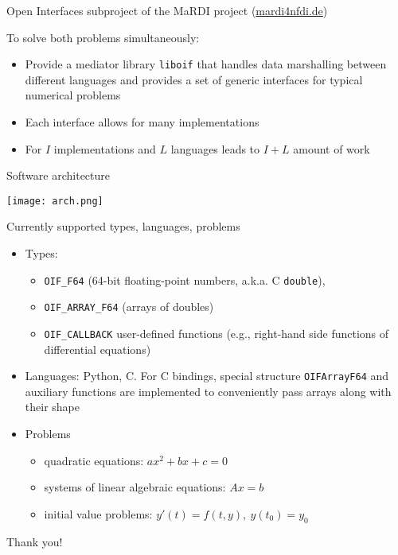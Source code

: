 \documentclass[10pt, aspectratio=169, progressbar=frametitle]{beamer}
\begin{document}
\begin{frame}{Open Interfaces subproject of the MaRDI project
  (\url{mardi4nfdi.de})}
  \begin{minipage}{0.45\textwidth}
    To solve both problems simultaneously:
    \begin{itemize}
      \item Provide a mediator library \texttt{liboif} that handles
            data marshalling between different languages and provides a set
            of generic interfaces for typical numerical problems
      \item Each interface allows for many implementations
      \item For $I$ implementations and $L$ languages leads to $I + L$
            amount of work
    \end{itemize}
  \end{minipage}\hfill%
  \begin{minipage}{0.50\textwidth}
    
  \end{minipage}
\end{frame}

\begin{frame}{Software architecture}
  \begin{center}
    \texttt{[image: arch.png]}
  \end{center}
\end{frame}

\begin{frame}{Currently supported types, languages, problems}
  \begin{itemize}
    \item Types:
      \begin{itemize}
        \item \texttt{OIF\_F64} (64-bit floating-point numbers, a.k.a. C \texttt{double}),
        \item \texttt{OIF\_ARRAY\_F64} (arrays of doubles)
        \item \texttt{OIF\_CALLBACK} user-defined functions
          (e.g., right-hand side functions of differential equations)
      \end{itemize}
    \item Languages: Python, C. For C bindings, special structure \texttt{OIFArrayF64} and auxiliary
      functions are implemented to conveniently pass arrays
      along with their shape
    \item Problems
      \begin{itemize}
        \item quadratic equations: $ax^2 + bx + c = 0$
        \item systems of linear algebraic equations: $Ax = b$
        \item initial value problems: $y'(t) = f(t, y),\ y(t_0) = y_0$
      \end{itemize}
  \end{itemize}
\end{frame}

\begin{frame}[standout]
  \centering
  \Huge
  Thank you!
\end{frame}
\end{document}
